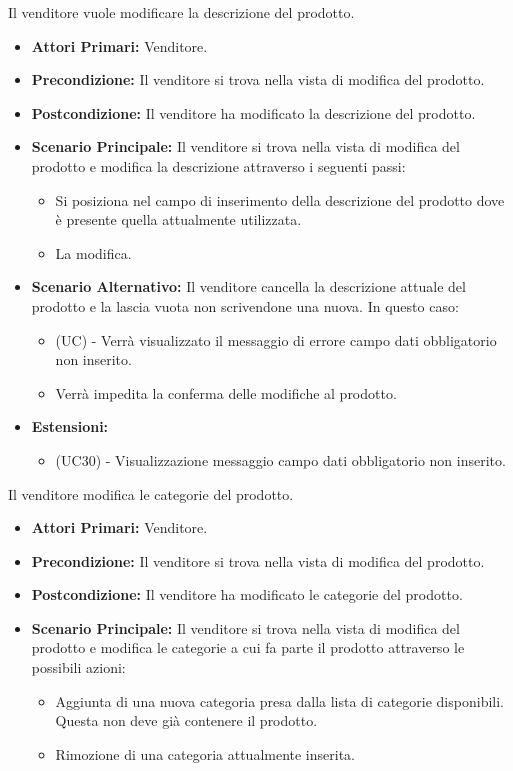 Il venditore vuole modificare la descrizione del prodotto.
\begin{itemize}
    \item \textbf{Attori Primari:} Venditore.
    \item \textbf{Precondizione:} Il venditore si trova nella vista di modifica del prodotto.
    \item \textbf{Postcondizione:} Il venditore ha modificato la descrizione del prodotto.
    \item \textbf{Scenario Principale:} Il venditore si trova nella vista di modifica del prodotto e modifica la descrizione attraverso i seguenti passi:
    \begin{itemize}
        \item Si posiziona nel campo di inserimento della descrizione del prodotto dove è presente quella attualmente utilizzata.
        \item La modifica.
    \end{itemize}
    \item \textbf{Scenario Alternativo:} Il venditore cancella la descrizione attuale del prodotto e la lascia vuota non scrivendone una nuova. In questo caso:
    \begin{itemize}
        \item (UC) - Verrà visualizzato il messaggio di errore campo dati obbligatorio non inserito.
        \item Verrà impedita la conferma delle modifiche al prodotto.
    \end{itemize}
    \item \textbf{Estensioni:}
    \begin{itemize}
        \item (UC30) - Visualizzazione messaggio campo dati obbligatorio non inserito.
    \end{itemize}
\end{itemize}

Il venditore modifica le categorie del prodotto.
\begin{itemize}
    \item \textbf{Attori Primari:} Venditore.
    \item \textbf{Precondizione:} Il venditore si trova nella vista di modifica del prodotto.
    \item \textbf{Postcondizione:} Il venditore ha modificato le categorie del prodotto.
    \item \textbf{Scenario Principale:} Il venditore si trova nella vista di modifica del prodotto e modifica le categorie a cui fa parte il prodotto attraverso le possibili azioni:
    \begin{itemize}
        \item Aggiunta di una nuova categoria presa dalla lista di categorie disponibili. Questa non deve già contenere il prodotto.
        \item Rimozione di una categoria attualmente inserita.
    \end{itemize}
\end{itemize}

